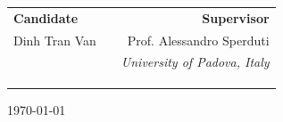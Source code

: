 \begin{titlepage}
\begin{center}
		{\centering
		\begin{tabular}{ l c r }
			{\large{\bf Candidate}}					& \hspace{90pt} 					& {\large{\bf Supervisor}}\\
			\textrm{\large Dinh Tran Van}						&				 					& \textrm{\large Prof. Alessandro Sperduti} \\
													&				 					& {\em University of Padova, Italy}\vspace{5mm}\\
			 				&				 					& \\
							&									& \\
													&									& \\
		\end{tabular}
		}
		\vfill
		
		\today
		
	\end{center}
\end{titlepage}